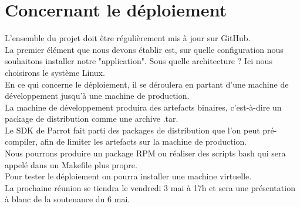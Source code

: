 \documentclass[]{article}
\begin{document}
\section{Concernant le déploiement}
L'ensemble du projet doit être régulièrement mis à jour sur GitHub.\\
La premier élément que nous devons établir est, sur quelle configuration nous souhaitons installer notre "application". Sous quelle architecture ? Ici nous choisirons le système Linux.\\
En ce qui concerne le déploiement, il se déroulera en partant d'une machine de développement jusqu'à une machine de production.\\
La machine de développement produira des artefacts binaires, c'est-à-dire un package de distribution comme une archive .tar.\\
Le SDK de Parrot fait parti des packages de distribution que l'on peut pré-compiler, afin de limiter les artefacts sur la machine de production.\\
Nous pourrons produire un package RPM ou réaliser des scripts bash qui sera appelé dans un Makefile plus propre.\\
Pour tester le déploiement on pourra installer une machine virtuelle.\\ 
La prochaine réunion se tiendra le vendredi 3 mai à 17h et sera une présentation à blanc de la soutenance du 6 mai.\\
\end{document}

